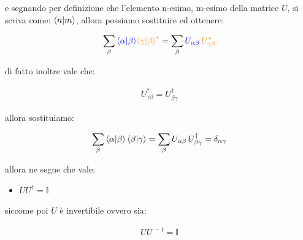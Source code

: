 	e segnando per definizione che l'elemento n-esimo, m-esimo della matrice $U$, si scriva come: $\braket{n}{m}$, allora possiamo sostituire ed ottenere:

\begin{align*}
	\sum_{\beta} \textcolor{blue}{ \braket{\alpha}{\beta}} \textcolor{orange}{\braket{\gamma}{\beta}^*} = \sum_{\beta} \textcolor{blue}{U_{\alpha \beta}} \, \textcolor{orange}{U^*_{\gamma \beta}}
\end{align*}

	di fatto inoltre vale che:
	
\begin{align*}
	U^*_{\gamma \beta} = U^{\dagger}_{\beta \gamma}
\end{align*}

	allora sostituiamo:
	
\begin{align*}
	\sum_{\beta} \braket{\alpha}{\beta} \braket{\beta}{\gamma} = \sum_{\beta} U_{\alpha \beta} \, U^{\dagger}_{\beta \gamma} = \delta_{\alpha \gamma}
\end{align*}

	allora ne segue che vale:
	
\begin{itemize}
	\item $UU^{\dagger} = \mathbb{I}$
\end{itemize}

	siccome poi $U$ è invertibile ovvero sia:
	
\begin{align*}
	UU^{\, -1} = \mathbb{I}
\end{align*}

